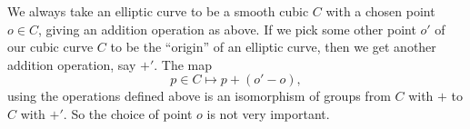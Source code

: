 \begin{example}
We always take an elliptic curve to be a smooth cubic \(C\) with a chosen point \(o \in C\), giving an addition operation as above.
If we pick some other point \(o'\) of our cubic curve \(C\) to be the ``origin'' of an elliptic curve, then we get another addition operation, say \(+'\).
The map
\[
p \in C \mapsto p+(o'-o),
\]
using the operations defined above is an isomorphism of groups from \(C\) with \(+\) to \(C\) with \(+'\).
So the choice of point \(o\) is not very important.
\end{example}
